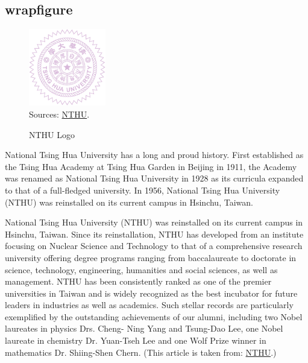 \documentclass[utf8,12pt]{article} %
\begin{document}
\subsection{wrapfigure}
%
%
\begin{spacing}{1.5}
%
\begin{figure} %
\centering
\includegraphics[width=0.3\textwidth]{Fig/nthulogo}\\
\footnotesize{Sources: \href{https://www.nthu.edu.tw/files/cis/cis-1.pdf}{NTHU}.}
\caption{NTHU Logo}
\end{figure}
%
National Tsing Hua University has a long and proud history. First established as the Tsing Hua Academy at Tsing Hua Garden in Beijing in 1911,
the Academy was renamed as National Tsing Hua University in 1928 as its curricula expanded to that of a full-fledged university.
In 1956, National Tsing Hua University (NTHU) was reinstalled on its current campus in Hsinchu, Taiwan.

National Tsing Hua University (NTHU) was reinstalled on its current campus in Hsinchu, Taiwan.
Since its reinstallation, NTHU has developed from an institute focusing on Nuclear Science and Technology to that of a comprehensive research university
offering degree programs ranging from baccalaureate to doctorate in science, technology, engineering, humanities and social sciences, as well as management.
NTHU has been consistently ranked as one of the premier universities in Taiwan and is widely recognized as the best incubator for future leaders in industries as well as academics.
Such stellar records are particularly exemplified by the outstanding achievements of our alumni, including two Nobel laureates in physics Drs. Cheng- Ning Yang and Tsung-Dao Lee,
one Nobel laureate in chemistry Dr. Yuan-Tseh Lee and one Wolf Prize winner in mathematics Dr. Shiing-Shen Chern.
(This article is taken from: \href{https://www.nthu.edu.tw/about/nthuIntro/en}{NTHU}.)
%
\end{spacing}
%
%
%
\end{document}
